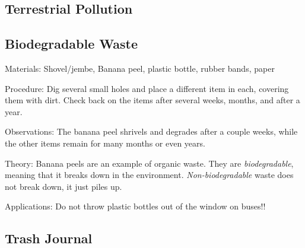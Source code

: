 \begin{multicols}{2}
\section*{Terrestrial Pollution}


\subsection{Biodegradable Waste} %


\begin{description*}
\item[Materials:]{Shovel/jembe, Banana peel, plastic bottle, rubber bands, paper}
\item[Procedure:]{Dig several small holes and place a different item in each, covering them with dirt. Check back on the items after several weeks, months, and after a year.}
\item[Observations:]{The banana peel shrivels and degrades after a couple weeks, while the other items remain for many months or even years.}
\item[Theory:]{Banana peels are an example of organic waste. They are \emph{biodegradable}}, meaning that it breaks down in the environment. \emph{Non-biodegradable} waste does not break down, it just piles up.
\item[Applications:]{Do not throw plastic bottles out of the window on buses!!}
\end{description*}


\subsection{Trash Journal} %



\end{multicols}
